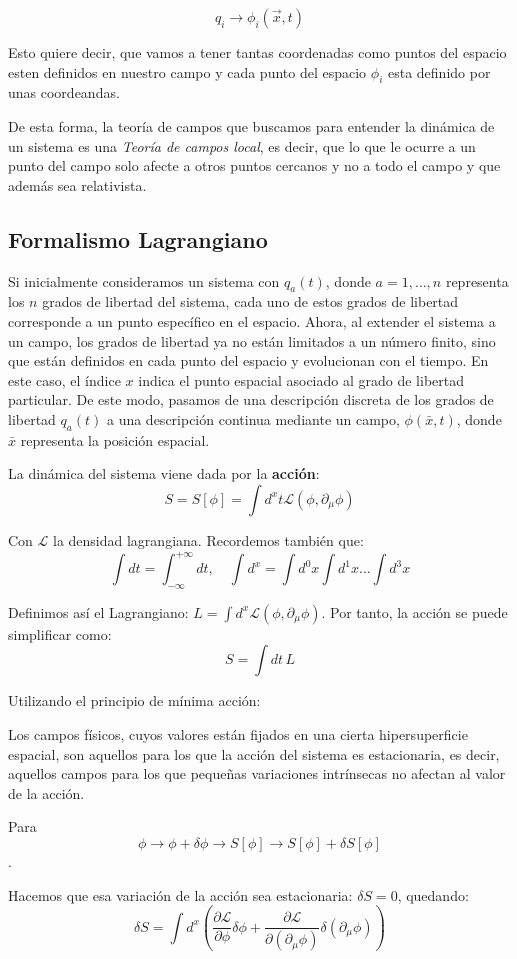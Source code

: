 \[q_{i}\to\phi_{i}(\vec{x},t)\]

Esto quiere decir, que vamos a tener tantas coordenadas como puntos del espacio esten definidos en nuestro campo y cada punto del espacio $\phi_{i}$ esta definido por unas coordeandas. 

De esta forma, la teoría de campos que buscamos para entender la dinámica de un sistema es una \textit{Teoría de campos local}, es decir, que lo que le ocurre a un punto del campo solo afecte a otros puntos cercanos y no a todo el campo y que además sea relativista.
\subsection{Formalismo Lagrangiano}
Si inicialmente consideramos un sistema con $q_a(t)$, donde $a = 1, \ldots, n$ representa los $n$ grados de libertad del sistema, cada uno de estos grados de libertad corresponde a un punto específico en el espacio. Ahora, al extender el sistema a un campo, los grados de libertad ya no están limitados a un número finito, sino que están definidos en cada punto del espacio y evolucionan con el tiempo. En este caso, el índice $x$ indica el punto espacial asociado al grado de libertad particular. De este modo, pasamos de una descripción discreta de los grados de libertad $q_a(t)$ a una descripción continua mediante un campo, $\phi(\bar{x}, t)$, donde $\bar{x}$ representa la posición espacial.

La dinámica del sistema viene dada por la \textbf{acción}:
$$
S = S[\phi] = \int d^x t \mathcal{L}(\phi, \partial_\mu \phi)
$$

Con $\mathcal{L}$ la densidad lagrangiana. Recordemos también que:
$$
\int dt = \int_{-\infty}^{+\infty} dt, \quad \int d^x = \int d^0 x \int d^1 x \ldots \int d^3 x
$$

Definimos así el Lagrangiano: $L = \int d^x \mathcal{L}(\phi, \partial_\mu \phi)$. Por tanto, la acción se puede simplificar como:
$$
S = \int dt \, L
$$

Utilizando el principio de mínima acción: 

\begin{proposition}
  Los campos físicos, cuyos valores están fijados en una cierta hipersuperficie espacial, son aquellos para los
que la acción del sistema es estacionaria, es decir, aquellos campos para
los que pequeñas variaciones intrínsecas no afectan al valor de la acción.

Para
 $$\phi \rightarrow \phi + \delta \phi \rightarrow S[\phi] \rightarrow S[\phi] + \delta S[\phi]$$. 

Hacemos que esa variación de la acción sea estacionaria: $\delta S = 0$, quedando:
$$
\delta S = \int d^x \left( \frac{\partial \mathcal{L}}{\partial \phi} \delta \phi + \frac{\partial \mathcal{L}}{\partial (\partial_\mu \phi)} \delta (\partial_\mu \phi) \right)
$$
\end{proposition}

